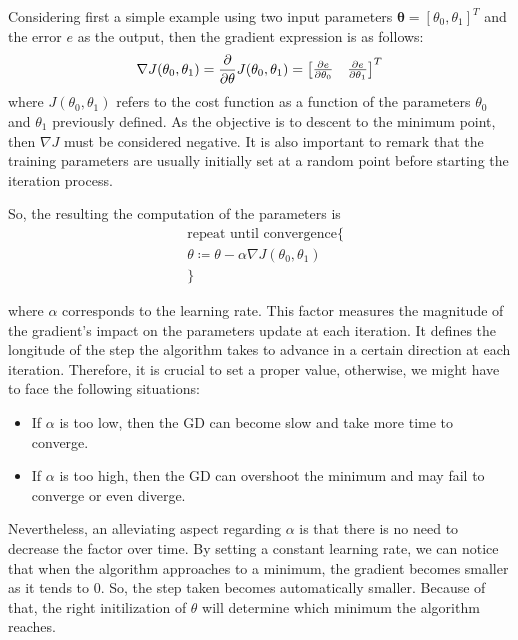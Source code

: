 \documentclass[a4paper, report, oneside, UKenglish]{memoir}
\newcommand{\btheta}{\boldsymbol{\theta}}
\begin{document}
Considering first a simple example using two input parameters $\btheta = [\theta_{0}, \theta_{1}]^T$ and the error $e$ as the output, then the gradient expression is as follows:
\begin{equation}
    \nabla J(\theta_{0},\theta_{1}) = \pdv{}{\theta} J(\theta_{0},\theta_{1}) = \begin{bmatrix}
                                                                                \pdv{e}{\theta_{0}} &                                 \pdv{e}{\theta_{1}}\\
                                                                                \end{bmatrix}^T
\end{equation}
where $J(\theta_{0},\theta_{1})$ refers to the cost function as a function of the parameters $\theta_{0}$ and $\theta_{1}$ previously defined. As the objective is to descent to the minimum point, then $\nabla J$ must be considered negative. It is also important to remark that the training parameters are usually initially set at a random point before starting the iteration process.

So, the resulting the computation of the parameters is
\begin{equation}\label{eq:gdeq}
\begin{split}
    &\mbox{repeat until convergence}\{\\
    &\theta \coloneqq \theta - \alpha \nabla J(\theta_{0},\theta_{1})\\
&\}
\end{split}
\end{equation}

where $\alpha$ corresponds to the learning rate. This factor measures the magnitude of the gradient's impact on the parameters update at each iteration. It defines the longitude of the step the algorithm takes to advance in a certain direction at each iteration. Therefore, it is crucial to set a proper value, otherwise, we might have to face the following situations:
\begin{itemize}
    \item  If $\alpha$ is too low, then the GD can become slow and take more time to converge.
    \item  If $\alpha$ is too high, then the GD can overshoot the minimum and may fail to converge or even diverge.  
\end{itemize}

Nevertheless, an alleviating aspect regarding $\alpha$ is that there is no need to decrease the factor over time. By setting a constant learning rate, we can notice that when the algorithm approaches to a minimum, the gradient becomes smaller as it tends to 0. So, the step taken becomes automatically smaller. Because of that, the right initilization of $\theta$ will determine which minimum the algorithm reaches. 
\end{document}
